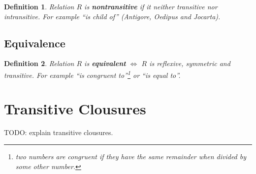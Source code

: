 \documentclass[11pt]{article}
\theoremstyle{plain}
\newtheorem{defn}{Definition}
\theoremstyle{definition}
\begin{document}
\begin{defn}
  Relation $R$ is \textbf{nontransitive} if it neither transitive nor intransitive.
  For example ``is child of'' (Antigore, Oedipus and Jocarta).
\end{defn}


\subsection{Equivalence}

\begin{defn}
  Relation $R$ is \textbf{equivalent} $\iff$ $R$ is reflexive, symmetric and transitive.
  For example ``is congruent to''\footnote{two numbers are congruent if they have the same remainder when divided by some other number.} or ``is equal to''.
\end{defn}


\section{Transitive Clousures}

TODO: explain transitive clousures.
\end{document}
